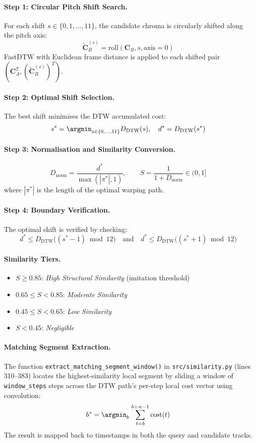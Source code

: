 \documentclass[12pt,a4paper]{article}
\begin{document}
\paragraph{Step 1: Circular Pitch Shift Search.}
For each shift $s \in \{0, 1, \ldots, 11\}$, the candidate chroma is circularly
shifted along the pitch axis:
\[
  \tilde{\mathbf{C}}_B^{(s)} = \mathrm{roll}(\mathbf{C}_B, s, \mathrm{axis}=0)
\]
FastDTW \cite{salvador2004fastdtw} with Euclidean frame distance is applied to
each shifted pair $(\mathbf{C}_A^T, (\tilde{\mathbf{C}}_B^{(s)})^T)$.

\paragraph{Step 2: Optimal Shift Selection.}
The best shift minimises the DTW accumulated cost:
\[
  s^* = \argmin_{s \in \{0,\ldots,11\}} D_{\mathrm{DTW}}(s), \quad d^* = D_{\mathrm{DTW}}(s^*)
\]

\paragraph{Step 3: Normalisation and Similarity Conversion.}
\[
  D_{\mathrm{norm}} = \frac{d^*}{\max(|\pi^*|, 1)}, \qquad
  S = \frac{1}{1 + D_{\mathrm{norm}}} \in (0, 1]
\]
where $|\pi^*|$ is the length of the optimal warping path.

\paragraph{Step 4: Boundary Verification.}
The optimal shift is verified by checking:
\[
  d^* \leq D_{\mathrm{DTW}}\bigl((s^* - 1) \bmod 12\bigr)
  \quad\text{and}\quad
  d^* \leq D_{\mathrm{DTW}}\bigl((s^* + 1) \bmod 12\bigr)
\]

\paragraph{Similarity Tiers.}
\begin{itemize}[noitemsep]
  \item $S \geq 0.85$: \emph{High Structural Similarity} (imitation threshold)
  \item $0.65 \leq S < 0.85$: \emph{Moderate Similarity}
  \item $0.45 \leq S < 0.65$: \emph{Low Similarity}
  \item $S < 0.45$: \emph{Negligible}
\end{itemize}

\paragraph{Matching Segment Extraction.}
The function \texttt{extract\_matching\_segment\_window()} in
\texttt{src/similarity.py} (lines 310--383) locates the highest-similarity
local segment by sliding a window of \texttt{window\_steps} steps across the
DTW path's per-step local cost vector using convolution:
\[
  b^* = \argmin_{b}\, \sum_{t=b}^{b+w-1} \mathrm{cost}(t)
\]
The result is mapped back to timestamps in both the query and candidate tracks.
\end{document}
